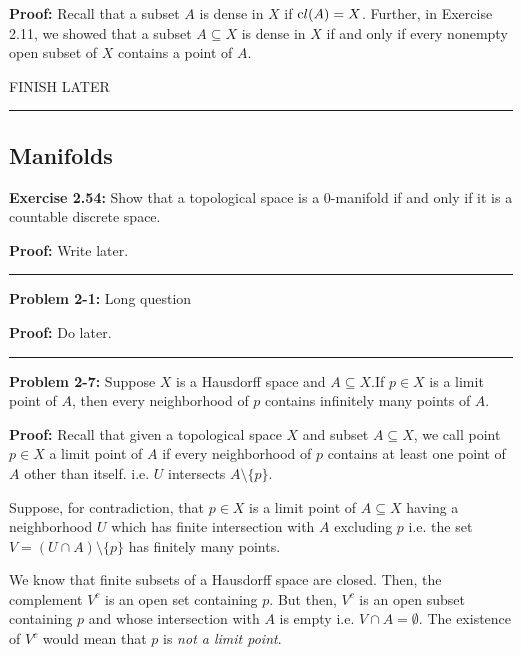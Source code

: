 \documentclass{article}
\newcommand*{\cl}{\text cl}
\begin{document}
\textbf{Proof:} Recall that a subset $A$ is dense in $X$ if $\cl(A) = X$. Further, in Exercise 2.11, we showed that a subset $A \subseteq X$ is dense in $X$ if and only if every nonempty open subset of $X$ contains a point of $A$. 

\vskip 0.5cm

FINISH LATER

\vskip 0.5cm
\hrule
\vskip 0.5cm

\subsection{Manifolds}

\textbf{Exercise 2.54:} Show that a topological space is a 0-manifold if and only if it is a countable discrete space.

\vskip 0.5cm

\textbf{Proof:} Write later.

\vskip 0.5cm
\hrule
\vskip 0.5cm

\textbf{Problem 2-1:} Long question

\vskip 0.5cm

\textbf{Proof:} Do later.

\vskip 0.5cm
\hrule
\vskip 0.5cm

\textbf{Problem 2-7:} Suppose $X$ is a Hausdorff space and $A \subseteq X$.If $p \in X$ is a limit point of $A$, then every neighborhood of $p$ contains infinitely many points of $A$.

\vskip 0.5cm

\textbf{Proof:} Recall that given a topological space $X$ and subset $A \subseteq X$, we call point $p \in X$ a limit point of $A$ if every neighborhood of $p$ contains at least one point of $A$ other than itself. i.e. $U$ intersects $A \setminus \{p\}$.

\vskip 0.5cm

Suppose, for contradiction, that $p \in X$ is a limit point of $A \subseteq X$ having a neighborhood $U$ which has finite intersection with $A$ excluding $p$ i.e. the set $V = (U \cap A) \setminus \{p\}$ has finitely many points. 

\vskip 0.5cm

We know that finite subsets of a Hausdorff space are closed. Then, the complement $V^c$ is an open set containing $p$. But then, $V^{c}$ is an open subset containing $p$ and whose intersection with $A$ is empty i.e. $V \cap A = \emptyset$. The existence of $V^c$ would mean that $p$ is \emph{not a limit point}.
\end{document}
